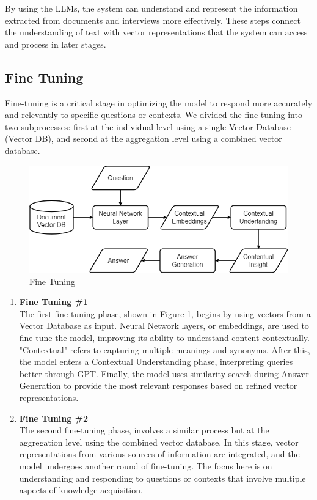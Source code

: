 \documentclass[runningheads]{llncs}
\begin{document}
By using the LLMs, the system can understand and represent the information extracted from documents and interviews more effectively. These steps connect the understanding of text with vector representations that the system can access and process in later stages.

\subsection{Fine Tuning}
Fine-tuning is a critical stage in optimizing the model to respond more accurately and relevantly to specific questions or contexts. We divided the fine tuning into two subprocesses: first at the individual level using a single Vector Database (Vector DB), and second at the aggregation level using a combined vector database.

\begin{figure}[htbp]
    \centerline{\includegraphics[scale=0.4]{eng-fine1.png}}
    \caption{Fine Tuning}
    \label{fig:fine-tuning-1}
\end{figure}

\begin{enumerate}
    \item \textbf{Fine Tuning \#1} \\
    
    The first fine-tuning phase, shown in Figure \ref{fig:fine-tuning-1}, begins by using vectors from a Vector Database as input. Neural Network layers, or embeddings, are used to fine-tune the model, improving its ability to understand content contextually. "Contextual" refers to capturing multiple meanings and synonyms. After this, the model enters a Contextual Understanding phase, interpreting queries better through GPT. Finally, the model uses similarity search during Answer Generation to provide the most relevant responses based on refined vector representations.
                    
    \item \textbf{Fine Tuning \#2} \\
        The second fine-tuning phase, involves a similar process but at the aggregation level using the combined vector database. In this stage, vector representations from various sources of information are integrated, and the model undergoes another round of fine-tuning. The focus here is on understanding and responding to questions or contexts that involve multiple aspects of knowledge acquisition.
\end{enumerate}
\end{document}
